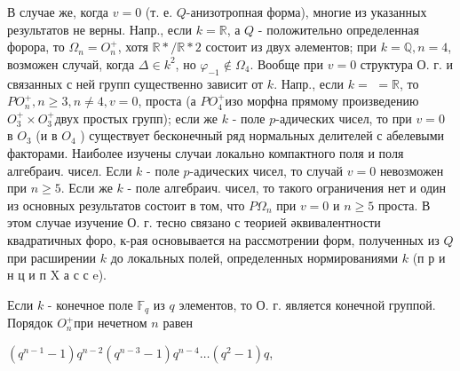 \documentclass[10pt]{article}
\begin{document}
В случае же, когда $v=0$ (т. е. $Q$-анизотропная форма), многие из указанных результатов не верны. Напр., если $k=\mathbb{R}$, а $Q$ - положительно определенная форора, то $\Omega_{n}=O_{n}^{+}$, хотя $\mathbb{R} * / \mathbb{R} * 2$ состоит из двух әлементов; при $k=\mathbb{Q}, n=4$, возможен случай, когда $\Delta \in k^{2}$, но $\varphi_{-1} \notin \Omega_{4}$. Вообще при $v=0$ структура О. г. и связанных с ней групп существенно зависит от $k$. Напр., если $k=$ $=\mathbb{R}$, то $P O_{n}^{+}, n \geqslant 3, n \neq 4, v=0$, проста (а $P O_{4}^{+}$изо морфна прямому произведению $O_{3}^{+} \times O_{3}^{+}$двух простых групп); если же $k$ - поле $p$-адических чисел, то при $v=0$ в $O_{3}$ (и в $O_{4}$ ) существует бесконечный ряд нормальных делителей с абелевыми факторами. Наиболее изучены случаи локально компактного поля и поля алгебраич. чисел. Если $k$ - поле $p$-адических чисел, то случай $v=0$ невозможен при $n \geqslant 5$. Если же $k$ - поле алгебраич. чисел, то такого ограничения нет и один из основных результатов состоит в том, что $P \Omega_{n}$ при $v=0$ и $n \geqslant 5$ проста. В этом случае изучение О. г. тесно связано с теорией әквивалентности квадратичных форо, к-рая основывается на рассмотрении форм, полученных из $Q$ при расширении $k$ до локальных полей, определенных нормированиями $k$ (п р и н ц и п $\mathrm{X}$ а с с e).



Если $k$ - конечное поле $\mathbb{F}_{q}$ из $q$ элементов, то О. г. является конечной группой. Порядок $O_{n}^{+}$при нечетном $n$ равен



$\left(q^{n-1}-1\right) q^{n-2}\left(q^{n-3}-1\right) q^{n-4} \ldots\left(q^{2}-1\right) q$,
\end{document}
